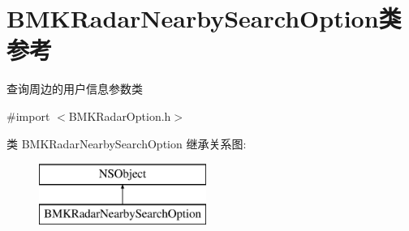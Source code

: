 \hypertarget{interface_b_m_k_radar_nearby_search_option}{}\section{B\+M\+K\+Radar\+Nearby\+Search\+Option类 参考}
\label{interface_b_m_k_radar_nearby_search_option}


查询周边的用户信息参数类  




{\ttfamily \#import $<$B\+M\+K\+Radar\+Option.\+h$>$}

类 B\+M\+K\+Radar\+Nearby\+Search\+Option 继承关系图\+:\begin{figure}[H]
\begin{center}
\leavevmode
\includegraphics[height=2.000000cm]{interface_b_m_k_radar_nearby_search_option}
\end{center}
\end{figure}
